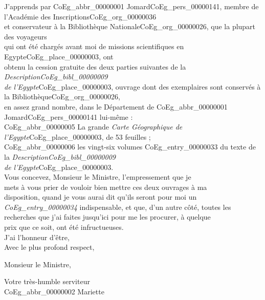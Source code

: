 \documentclass{book}
\begin{document}
\indent J’apprends par \gls{CoEg_abbr_00000001} Jomard\gls{CoEg_pers_00000141}, membre de l’Académie des Inscriptions\gls{CoEg_org_00000036}\\
et conservateur à la Bibliothèque Nationale\gls{CoEg_org_00000026}, que la plupart des voyageurs\\
qui ont été chargés avant moi de missions scientifiques en Egypte\gls{CoEg_place_00000003}, ont\\
obtenu la cession gratuite des deux parties suivantes de la \textit{Description\gls{CoEg_bibl_00000009}\\
de l’Egypte}\gls{CoEg_place_00000003}, ouvrage dont des exemplaires sont conservés à la Bibliothèque\gls{CoEg_org_00000026},\\
en assez grand nombre, dans le Département de \gls{CoEg_abbr_00000001} Jomard\gls{CoEg_pers_00000141} lui-même :\\
\indent \gls{CoEg_abbr_00000005} La grande \textit{Carte Géographique de l’Egypte}\gls{CoEg_place_00000003}, de 53 feuilles ;\\
\indent \gls{CoEg_abbr_00000006} les vingt-six volumes \gls{CoEg_entry_00000033} du texte de la \textit{Description\gls{CoEg_bibl_00000009}\\
de l’Egypte}\gls{CoEg_place_00000003}.\\
\indent Vous concevez, Monsieur le Ministre, l’empressement que je\\
mets à vous prier de vouloir bien mettre ces deux ouvrages à ma\\
disposition, quand je vous aurai dit qu’ils seront pour moi un\\
\textit{\gls{CoEg_entry_00000034}} indispensable, et que, d’un autre côté, toutes les\\
recherches que j’ai faites jusqu’ici pour me les procurer, à quelque\\
prix que ce soit, ont été infructueuses.\\
\indent J’ai l’honneur d’être,\\
\indent\hspace{5cm} Avec le plus profond respect,
\begin{center}Monsieur le Ministre,\end{center}
\begin{center}\hspace{5cm}Votre très-humble serviteur\\
\hspace{5cm}\gls{CoEg_abbr_00000002} Mariette\end{center}
\end{document}
